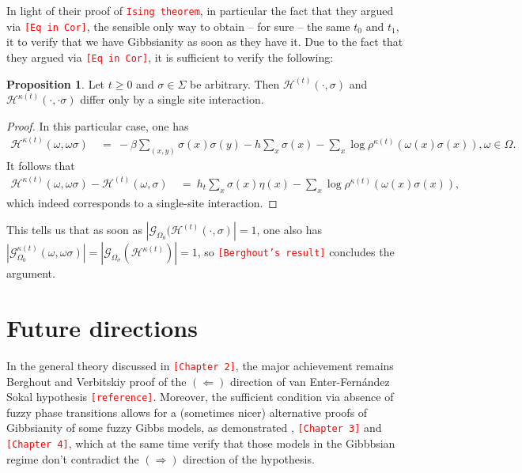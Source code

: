 \documentclass[12pt]{article}
\newcommand{\G}{\mathcal{G}}
\renewcommand{\H}{\mathcal{H}}
\newcommand{\pika}{\boldsymbol{\cdot}}
\newcommand{\1}{\mathbbm{1}}
\newcommand{\5}{\vspace{0.5cm}}
\theoremstyle{definition}
\newtheorem{prop}[thm]{Proposition}
\begin{document}
In light of their proof of \textcolor{red}{\textcolor{red}{\texttt{Ising theorem}}}, in particular the fact that they argued via \textcolor{red}{\texttt{[Eq in Cor]}}, the sensible only way to obtain -- for sure -- the same $t_0$ and $t_1$, it to verify that we have Gibbsianity as soon as they have it. Due to the fact that they argued via \textcolor{red}{\texttt{[Eq in Cor]}}, it is sufficient to verify the following:
\begin{prop} Let $t\geq 0$ and $\sigma\in\Sigma$ be arbitrary. Then $\H^{(t)}(\pika,\sigma)$ and $\H^{\kappa(t)}(\pika,\pika\sigma)$ differ only by a single site interaction.
\end{prop}
\begin{proof}
In this particular case, one has
\begin{align*}
\H^{\kappa(t)}(\omega,\omega\sigma) ~&=~ -\beta\sum_{(x,y)}\sigma(x)\sigma(y) - h\sum_{x}\sigma(x) -\sum_{x}\log\rho^{\kappa(t)}(\omega(x)\sigma(x)), \omega\in\Omega.
\end{align*}
It follows that
\begin{align*}
\H^{\kappa(t)}(\omega,\omega\sigma) - \H^{(t)}(\omega,\sigma) ~&=~ h_t\sum_{x}\sigma(x)\eta(x) - \sum_{x}\log\rho^{\kappa(t)}(\omega(x)\sigma(x)),
\end{align*}
which indeed corresponds to a single-site interaction.
\end{proof}

This tells us that as soon as $|\G_{\Omega_0}(\H^{(t)}(\pika,\sigma)|=1$, one also has $|\G_{\Omega_0}^{\kappa(t)}(\omega,\omega\sigma)|=|\G_{\Omega_\sigma}(\H^{\kappa(t)})|=1$, so \textcolor{red}{\texttt{[Berghout's result]}} concludes the argument.

\pagebreak



\section{Future directions}

In the general theory discussed in \textcolor{red}{\texttt{[Chapter 2]}}, the major achievement remains Berghout and Verbitskiy proof of the $(\Leftarrow)$ direction of van Enter-Fern\'andez Sokal hypothesis \textcolor{red}{\texttt{[reference]}}. Moreover, the sufficient condition via absence of fuzzy phase transitions allows for a (sometimes nicer) alternative proofs of Gibbsianity of some fuzzy Gibbs models, as demonstrated \cite{Gas}, \textcolor{red}{\texttt{[Chapter 3]}} and \textcolor{red}{\texttt{[Chapter 4]}}, which at the same time verify that those models in the Gibbbsian regime don't contradict the $(\Rightarrow)$ direction of the hypothesis. \\
\end{document}

